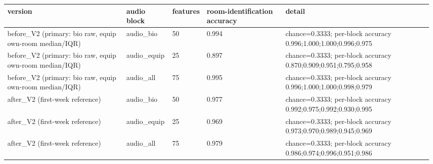 \begin{tabular}{lllll}
\hline
version & audio block & features & room-identification accuracy & detail \\
\hline
before\_V2 (primary: bio raw, equip own-room median/IQR) & audio\_bio & 50 & 0.994 & chance=0.3333; per-block accuracy 0.996;1.000;1.000;0.996;0.975 \\
before\_V2 (primary: bio raw, equip own-room median/IQR) & audio\_equip & 25 & 0.897 & chance=0.3333; per-block accuracy 0.870;0.909;0.951;0.795;0.958 \\
before\_V2 (primary: bio raw, equip own-room median/IQR) & audio\_all & 75 & 0.995 & chance=0.3333; per-block accuracy 0.996;1.000;1.000;0.998;0.979 \\
after\_V2 (first-week reference) & audio\_bio & 50 & 0.977 & chance=0.3333; per-block accuracy 0.992;0.975;0.992;0.930;0.995 \\
after\_V2 (first-week reference) & audio\_equip & 25 & 0.969 & chance=0.3333; per-block accuracy 0.973;0.970;0.989;0.945;0.969 \\
after\_V2 (first-week reference) & audio\_all & 75 & 0.979 & chance=0.3333; per-block accuracy 0.986;0.974;0.996;0.951;0.986 \\
\hline
\end{tabular}

